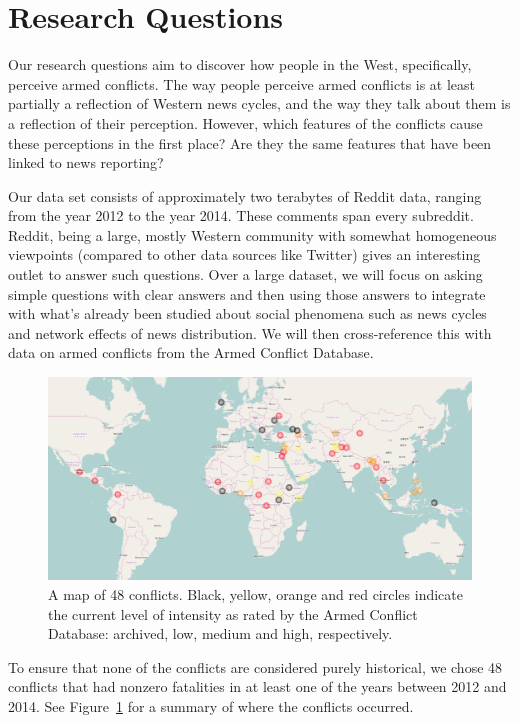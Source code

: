 \section{Research Questions}
Our research questions aim to discover how people in the West, specifically, perceive armed conflicts. The way people perceive armed conflicts is at least partially a reflection of Western news cycles, and the way they talk about them is a reflection of their perception. However, which features of the conflicts cause these perceptions in the first place? Are they the same features that have been linked to news reporting?

Our data set consists of approximately two terabytes of Reddit data, ranging from the year 2012 to the year 2014. These comments span every subreddit. Reddit, being a large, mostly Western community with somewhat homogeneous viewpoints (compared to other data sources like Twitter) gives an interesting outlet to answer such questions. Over a large dataset, we will focus on asking simple questions with clear answers and then using those answers to integrate with what's already been studied about social phenomena such as news cycles and network effects of news distribution. We will then cross-reference this with data on armed conflicts from the Armed Conflict Database. 

\begin{figure}
\centering
\includegraphics[width=0.9\columnwidth]{map}
\caption{A map of 48 conflicts. Black, yellow, orange and red circles indicate the current level of intensity as rated by the Armed Conflict Database: archived, low, medium and high, respectively.}
\label{conflicts}
\end{figure}

To ensure that none of the conflicts are considered purely historical, we chose 48 conflicts that had nonzero fatalities in at least one of the years between 2012 and 2014. See Figure~\ref{conflicts} for a summary of where the conflicts occurred. 

